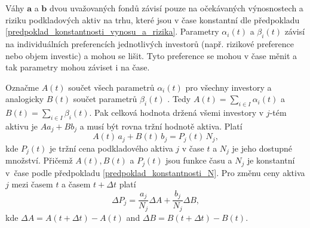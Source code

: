 \documentclass[a4paper,12pt]{report}
\theoremstyle{definition} \newtheorem{definice}[veta]{Definice}
\theoremstyle{remark}
\begin{document}
Váhy $\boldsymbol{a}$ a  $\boldsymbol{b}$ dvou uvažovaných fondů závisí pouze na očekávaných výnosnostech a riziku podkladových aktiv na trhu, které jsou v čase konstantní dle předpokladu \ref{predpoklad_konstantnosti_vynosu_a_rizika}.
Parametry $\alpha_i(t)$ a $\beta_i(t)$ závisí na individuálních preferencích jednotlivých investorů (např. rizikové preference nebo objem investic) a mohou se lišit.
Tyto preference se mohou v čase měnit a tak parametry mohou záviset i na čase.

Označme $A(t)$ součet všech parametrů $\alpha_i(t)$ pro všechny investory a analogicky $B(t)$ součet parametrů $\beta_i(t)$ .
Tedy $A(t)=\sum_{i\in I}\alpha_i(t)$ a $B(t)=\sum_{i\in I}\beta_i(t)$.
Pak celková hodnota držená všemi investory v $j$-tém aktivu je $Aa_j+Bb_j$ a musí být rovna tržní hodnotě aktiva.
Platí
$$A(t)\,a_j+B(t)\,b_j=P_j(t)\,N_j,$$
kde $P_j(t)$ je tržní cena podkladového aktiva $j$ v čase $t$ a $N_j$ je jeho dostupné množství.
Přičemž $A(t),B(t)$ a $ P_j(t)$ jsou funkce času a $N_j$ je konstantní v~čase podle předpokladu \ref{predpoklad_konstantnosti_N}.
Pro změnu ceny aktiva $j$ mezi časem $t$ a časem $t+\Delta t$ platí
\begin{displaymath}
\Delta P_j = \frac{a_j}{N_j}\Delta A + \frac{b_j}{N_j}\Delta B,
\end{displaymath}
kde $\Delta A = A(t+\Delta t) - A(t)$ and $\Delta B = B(t+\Delta t)- B(t)$.
\end{document}

